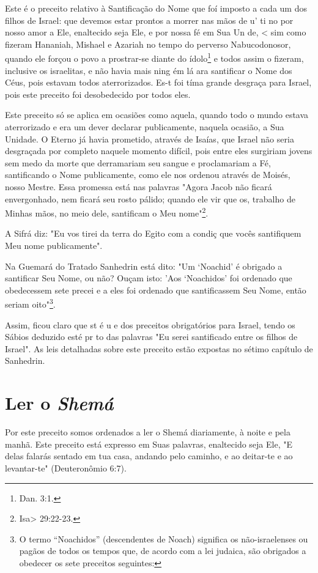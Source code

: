 Este é o preceito relativo à Santificação do Nome que foí imposto a cada
um dos filhos de Israel: que devemos estar prontos a morrer nas mãos de
u' ti no por nosso amor a Ele, enaltecido seja Ele, e por nossa fé em
Sua Un de, \textless{} sim como fizeram Hananiah, Mishael e Azariah no
tempo do perverso Nabucodonosor,
 quando ele forçou o povo a prostrar-se diante do ídolo\footnote{Dan. 3:1.} e todos assim o fizeram, inclusive os
 israelitas, e não havia mais nin­g ém lá ara santificar o Nome dos
 Céus, pois estavam todos aterrorizados. Es-t foi tíma grande desgraça
 para Israel, pois este preceito foi desobedecido por todos eles.

Este preceito só se aplica em ocasiões como aquela, quando todo o
mundo estava aterrorizado e era um dever declarar publicamente,
naquela ocasião, a Sua Unidade. O Eterno já havia prometido, através
de Isaías, que Is­rael não seria desgraçada por completo naquele
momento difícil, pois entre eles surgiriam jovens sem medo da morte
que derramariam seu sangue e proclama­riam a Fé, santificando o Nome
publicamente, como ele nos ordenou através de Moisés, nosso Mestre.
Essa promessa está nas palavras "Agora Jacob não ficará
envergonhado, nem ficará seu rosto pálido; quando ele vir que os,
trabalho de Minhas mãos, no meio dele, santificam o Meu nome"\footnote{Isa> 29:22-23.}.

A Sifrá diz: "Eu vos tirei da terra do Egito com a condiç que
vocês santifiquem Meu nome publicamente".


Na Guemará do Tratado Sanhedrin está dito: "Um `Noachid' é obri­gado a
santificar Seu Nome, ou não? Ouçam isto: 'Aos `Noachidos' foi ordenado
que obedecessem sete precei e a eles foi ordenado que santificassem
Seu Nome, então seriam oito"\footnote{O termo ``Noachidos'' (descendentes de Noach) significa os não-israelenses ou pagãos de todos os tempos que, de acordo com a lei judaica, são obrigados a obedecer os sete preceitos seguintes:}.

Assim, ficou claro que st é u e dos preceitos obrigatórios para Is­rael,
tendo os Sábios deduzido esté pr to das palavras "Eu serei santificado
entre os filhos de Israel". As leis detalhadas sobre este preceito estão
expostas no sétimo capítulo de Sanhedrin.

\section{Ler o \textit{Shemá}}

Por este preceito somos ordenados a ler o Shemá diariamente, à noi­te e
pela manhã. Este preceito está expresso em Suas palavras, enaltecido
seja Ele, "E delas falarás sentado em tua casa, andando pelo caminho, e
ao deitar-te e ao levantar-te" (Deuteronômio 6:7).

